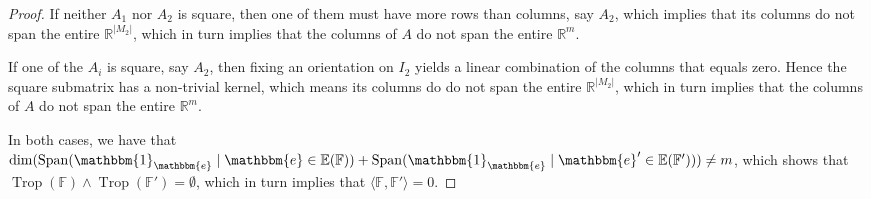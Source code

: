 \documentclass[11pt,reqno,a4paper]{amsart}
\theoremstyle{theoremstyle}
\theoremstyle{examplestyle}
\theoremstyle{algorithmstyle}
\newcommand{\EE}{\mathbb{E}}
\newcommand{\ee}{\mathbbm{e}}
\newcommand{\FF}{\mathbb{F}}
\newcommand{\RR}{\mathbb{R}}
\newcommand{\bbone}{\mathbbm{1}}
\DeclareMathOperator{\Span}{Span}
\DeclareMathOperator{\Trop}{Trop}
\begin{document}
\begin{proof}
  If neither $A_1$ nor $A_2$ is square, then one of them must have more rows than columns, say $A_2$, which implies that its columns do not span the entire $\RR^{|M_2|}$, which in turn implies that the columns of $A$ do not span the entire $\RR^m$.

  If one of the $A_i$ is square, say $A_2$, then fixing an orientation on $I_2$ yields a linear combination of the columns that equals zero.  Hence the square submatrix has a non-trivial kernel, which means its columns do do not span the entire $\RR^{|M_2|}$, which in turn implies that the columns of $A$ do not span the entire $\RR^m$.

  In both cases, we have that $\dim(\Span(\bbone_{\ee}\mid \ee\in\EE(\FF))+\Span(\bbone_{\ee}\mid \ee'\in\EE(\FF')))\neq m$, which shows that $\Trop(\FF)\wedge \Trop(\FF')=\emptyset$, which in turn implies that $\langle \FF,\FF'\rangle=0$.
\end{proof}
\end{document}
